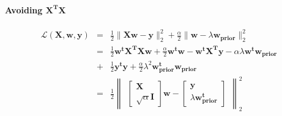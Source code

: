\documentclass[12pt]{article}
\newcommand{\B}[1]{\mathbf{#1}}
\begin{document}
\paragraph{Avoiding $\B{X^TX}$}
\begin{eqnarray*}
	\mathcal{L}(\B{X, w, y}) & = & \frac{1}{2} \| \B{Xw - y} \|_2^2 + \frac{\alpha}{2} \|\B w - \lambda \B{ w_{prior}}\|_2^2 \\
& = & \frac{1}{2}\B{w^tX^TXw} + \frac{\alpha}{2} \B{w^tw} - \B{w^tX^Ty} - \alpha \lambda \B{w^tw_{prior}} \\
 & + & \frac{1}{2}\B{y^ty} + \frac{\alpha}{2} \lambda^2 \B{w_{prior}^tw_{prior}} \\
& = & \frac{1}{2}
\begin{Vmatrix}
\begin{bmatrix} \B X\\ \sqrt{\alpha} \B I \end{bmatrix} \B w - \begin{bmatrix} \B y \\ \lambda \B{w_{prior}^t} \end{bmatrix}
\end{Vmatrix}_2^2 
\end{eqnarray*}


\end{document}

